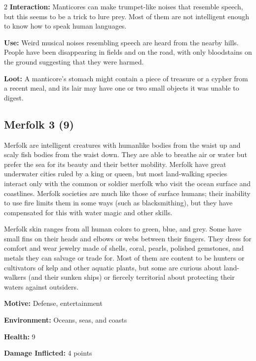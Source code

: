 \begin{multicols}{2}
\textbf{Interaction:} Manticores can make trumpet-like noises that resemble speech, but this seems to be a trick to lure prey. Most of them are not intelligent enough to know how to speak human languages. 

\textbf{Use:} Weird musical noises resembling speech are heard from the nearby hills. People have been disappearing in fields and on the road, with only bloodstains on the ground suggesting that they were harmed. 

\textbf{Loot:} A manticore’s stomach might contain a piece of treasure or a cypher from a recent meal, and its lair may have one or two small objects it was unable to digest.

\subsection{Merfolk 3 (9)}

Merfolk are intelligent creatures with humanlike bodies from the waist up and scaly fish bodies from the waist down. They are able to breathe air or water but prefer the sea for its beauty and their better mobility. Merfolk have great underwater cities ruled by a king or queen, but most land-walking species interact only with the common or soldier merfolk who visit the ocean surface and coastlines. Merfolk societies are much like those of surface humans; their inability to use fire limits them in some ways (such as blacksmithing), but they have compensated for this with water magic and other skills. 

Merfolk skin ranges from all human colors to green, blue, and grey. Some have small fins on their heads and elbows or webs between their fingers. They dress for comfort and wear jewelry made of shells, coral, pearls, polished gemstones, and metals they can salvage or trade for. Most of them are content to be hunters or cultivators of kelp and other aquatic plants, but some are curious about land-walkers (and their sunken ships) or fiercely territorial about protecting their waters against outsiders. 

\textbf{Motive:} Defense, entertainment 

\textbf{Environment:} Oceans, seas, and coasts

\textbf{Health:} 9 

\textbf{Damage Inflicted:} 4 points 


\end{multicols}
